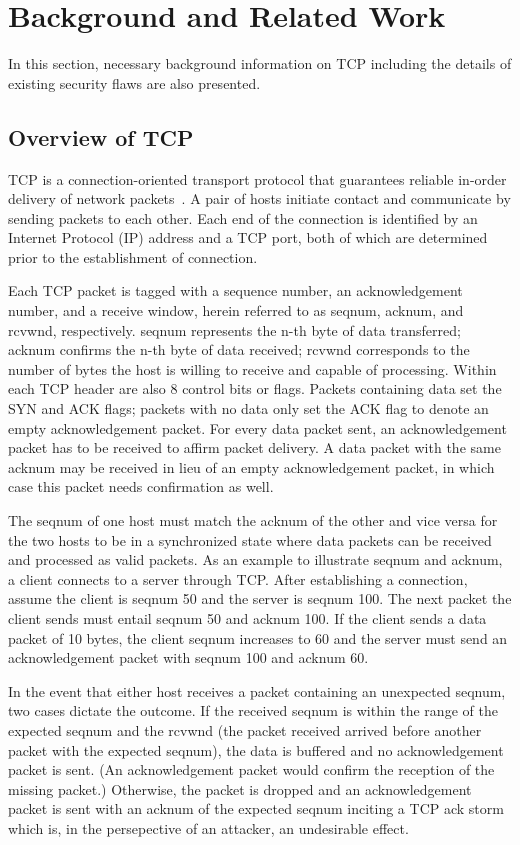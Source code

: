\documentclass{sig-alternate}
\begin{document}
\section{Background and Related Work}
\label{sec:background}

In this section, necessary background information on TCP including the details of existing security flaws are also presented.

\subsection{Overview of TCP}

TCP is a connection-oriented transport protocol that guarantees reliable in-order delivery of network packets~\cite{rfc:tcp}.
A pair of hosts initiate contact and communicate by sending packets to each other.
Each end of the connection is identified by an Internet Protocol (IP) address and a TCP port, both of which are determined prior to the establishment of connection.

Each TCP packet is tagged with a sequence number, an acknowledgement number, and a receive window, herein referred to as seqnum, acknum, and rcvwnd, respectively.
seqnum represents the n-th byte of data transferred; acknum confirms the n-th byte of data received; rcvwnd corresponds to the number of bytes the host is willing to receive and capable of processing.
Within each TCP header are also 8 control bits or flags.
Packets containing data set the SYN and ACK flags; packets with no data only set the ACK flag to denote an empty acknowledgement packet.
For every data packet sent, an acknowledgement packet has to be received to affirm packet delivery.
A data packet with the same acknum may be received in lieu of an empty acknowledgement packet, in which case this packet needs confirmation as well.

The seqnum of one host must match the acknum of the other and vice versa for the two hosts to be in a synchronized state where data packets can be received and processed as valid packets.
As an example to illustrate seqnum and acknum, a client connects to a server through TCP.
After establishing a connection, assume the client is seqnum 50 and the server is seqnum 100.
The next packet the client sends must entail seqnum 50 and acknum 100.
If the client sends a data packet of 10 bytes, the client seqnum increases to 60 and the server must send an acknowledgement packet with seqnum 100 and acknum 60.

In the event that either host receives a packet containing an unexpected seqnum, two cases dictate the outcome.
If the received seqnum is within the range of the expected seqnum and the rcvwnd (the packet received arrived before another packet with the expected seqnum), the data is buffered and no acknowledgement packet is sent.
(An acknowledgement packet would confirm the reception of the missing packet.) Otherwise, the packet is dropped and an acknowledgement packet is sent with an acknum of the expected seqnum inciting a TCP ack storm~\cite{anderson:ackstorm} which is, in the persepective of an attacker, an undesirable effect.
\end{document}

